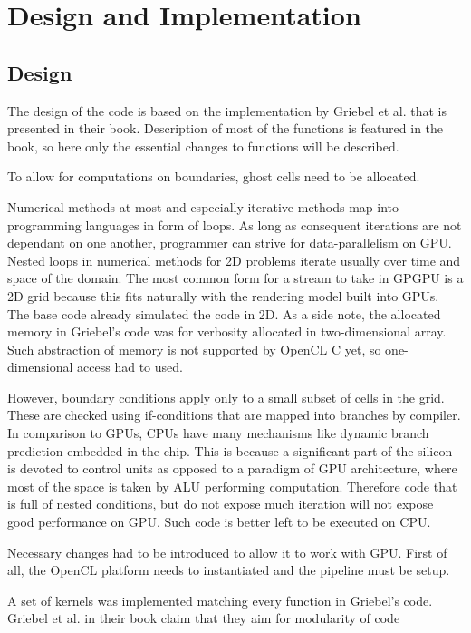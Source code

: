 \chapter{Design and Implementation}

\section{Design}
The design of the code is based on the implementation by Griebel et al. that is presented in their book\cite{griebel1998numerical}. Description of most of the functions is featured in the book, so here only the essential changes to functions will be described.

To allow for computations on boundaries, ghost cells need to be allocated.

Numerical methods at most and especially iterative methods map into programming languages in form of loops. As long as consequent iterations are not dependant on one another, programmer can strive for data-parallelism on GPU. Nested loops in numerical methods for 2D problems iterate usually over time and space of the domain. The most common form for a stream to take in GPGPU is a 2D grid because this fits naturally with the rendering model built into GPUs. The base code already simulated the code in 2D. As a side note, the allocated memory in Griebel's code was for verbosity allocated in two-dimensional array. Such abstraction of memory is not supported by OpenCL C yet, so one-dimensional access had to used.

However, boundary conditions apply only to a small subset of cells in the grid. These are checked using if-conditions that are mapped into branches by compiler. In comparison to GPUs, CPUs have many mechanisms like dynamic branch prediction embedded in the chip. This is because a significant part of the silicon is devoted to control units as opposed to a paradigm of GPU architecture, where most of the space is taken by ALU performing computation. Therefore code that is full of nested conditions, but do not expose much iteration will not expose good performance on GPU. Such code is better left to be executed on CPU.

Necessary changes had to be introduced to allow it to work with GPU. First of all, the OpenCL platform needs to instantiated and the pipeline must be setup.  


A set of kernels was implemented matching every function in Griebel's code. Griebel et al. in their book claim that they aim for modularity of code

